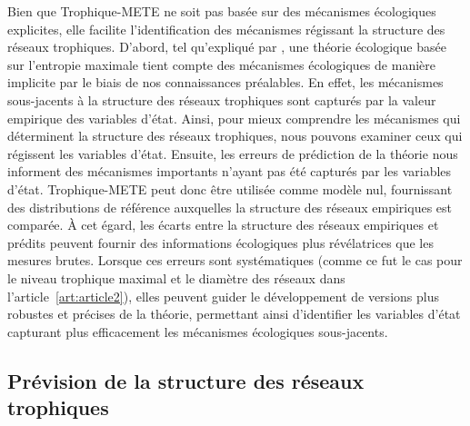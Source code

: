 Bien que Trophique-METE ne soit pas basée sur des mécanismes écologiques
explicites, elle facilite l'identification des mécanismes régissant la structure
des réseaux trophiques. D'abord, tel qu'expliqué par
\textcite{Harte2014Maximum}, une théorie écologique basée sur l'entropie
maximale tient compte des mécanismes écologiques de manière implicite par le
biais de nos connaissances préalables. En effet, les mécanismes sous-jacents à
la structure des réseaux trophiques sont capturés par la valeur empirique des
variables d'état. Ainsi, pour mieux comprendre les mécanismes qui déterminent la
structure des réseaux trophiques, nous pouvons examiner ceux qui régissent les
variables d'état. Ensuite, les erreurs de prédiction de la théorie nous
informent des mécanismes importants n'ayant pas été capturés par les variables
d'état. Trophique-METE peut donc être utilisée comme modèle nul, fournissant des
distributions de référence auxquelles la structure des réseaux empiriques est
comparée. À cet égard, les écarts entre la structure des réseaux empiriques et
prédits peuvent fournir des informations écologiques plus révélatrices que les
mesures brutes. Lorsque ces erreurs sont systématiques (comme ce fut le cas pour
le niveau trophique maximal et le diamètre des réseaux dans
l'article~\ref{art:article2}), elles peuvent guider le développement de versions
plus robustes et précises de la théorie, permettant ainsi d'identifier les
variables d'état capturant plus efficacement les mécanismes écologiques
sous-jacents. 

\subsection{Prévision de la structure des réseaux trophiques} 

